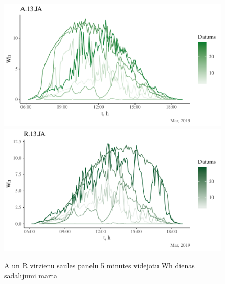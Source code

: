\begin{figure}[h]
    \centering
    \includegraphics[width=\linewidth]{figures/sol_day/mar_A13JA.pdf}
    \includegraphics[width=\linewidth]{figures/sol_day/mar_R13JA.pdf}
    \caption{A un R virzienu saules paneļu 5 minūtēs vidējotu Wh dienas sadalījumi martā}
    \label{fig:mar_ar}
\end{figure}


